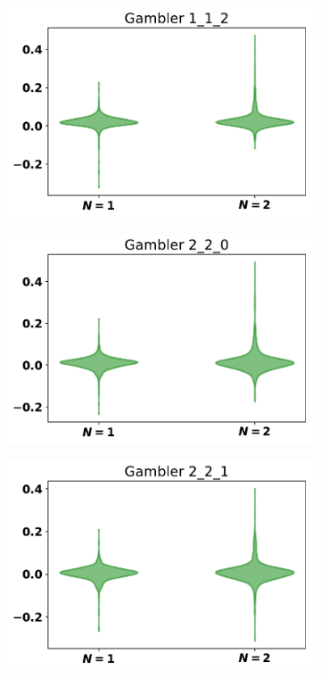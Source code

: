 \documentclass[10pt]{article}
\begin{document}
\begin{figure}
    \centering
    \begin{subfigure}{0.30\textwidth}
        \centering
        \includegraphics[width=\textwidth]{"img/Gambler 1_1_2_boxplot"}
    \end{subfigure}
    \begin{subfigure}{0.30\textwidth}
        \centering
        \includegraphics[width=\textwidth]{"img/Gambler 2_2_0_boxplot"}
    \end{subfigure}
    \begin{subfigure}{0.30\textwidth}
        \centering
        \includegraphics[width=\textwidth]{"img/Gambler 2_2_1_boxplot"}

\end{subfigure}
\end{figure}
\end{document}
